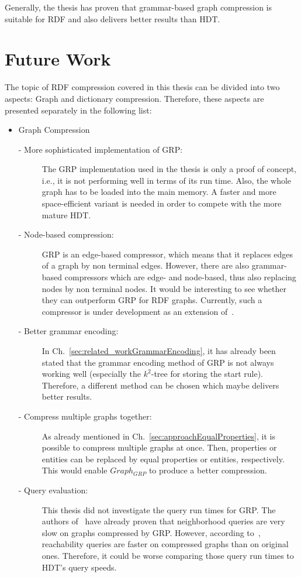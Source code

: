 Generally, the thesis has proven that grammar-based graph compression is suitable for RDF and also delivers better results than HDT.

\section{Future Work}\label{sec:futurework}

The topic of RDF compression covered in this thesis can be divided into two aspects: Graph and dictionary compression. Therefore, these aspects are presented separately in the following list:

\begin{itemize}
	\item Graph Compression
	\begin{description}
		\item [- More sophisticated implementation of GRP:] The GRP implementation used in the thesis is only a proof of concept, i.e., it is not performing well in terms of its run time. Also, the whole graph has to be loaded into the main memory. A faster and more space-efficient variant is needed in order to compete with the more mature HDT.
		\item [- Node-based compression:] GRP is an edge-based compressor, which means that it replaces edges of a graph by non terminal edges. However, there are also grammar-based compressors which are edge- and node-based, thus also replacing nodes by non terminal nodes. It would be interesting to see whether they can outperform GRP for RDF graphs. Currently, such a compressor is under development as an extension of~\cite{mattdk}.
		\item [- Better grammar encoding:] In Ch.~\ref{sec:related_workGrammarEncoding}, it has already been stated that the grammar encoding method of GRP is not always working well (especially the $k^2$-tree for storing the start rule). Therefore, a different method can be chosen which maybe delivers better results.
		\item [- Compress multiple graphs together:] As already mentioned in Ch.~\ref{sec:approachEqualProperties}, it is possible to compress multiple graphs at once. Then, properties or entities can be replaced by equal properties or entities, respectively. This would enable $Graph_{GRP}$ to produce a better compression.
		\item [- Query evaluation:] This thesis did not investigate the query run times for GRP. The authors of~\cite{maneth} have already proven that neighborhood queries are very slow on graphs compressed by GRP. However, according to~\cite{maneth}, reachability queries are faster on compressed graphs than on original ones. Therefore, it could be worse comparing those query run times to HDT's query speeds.

\end{description}
\end{itemize}
